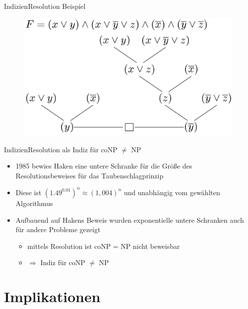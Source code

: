 \documentclass[ignorenonframetext,]{beamer}
\begin{document}
\begin{frame}{Indizien}{Resolution Beispiel}

\begin{figure}[htbp]
\centering
\includegraphics{img/res-beweis.png}
\end{figure}

\end{frame}

\begin{frame}{Indizien}{Resolution als Indiz für coNP $\neq$ NP}

\begin{itemize}
\itemsep1pt\parskip0pt
\item
  1985 bewies Haken eine untere Schranke für die Größe des
  Resolutionsbeweises für das Taubenschlagprinzip
\item
  Diese ist $(1.49^{0.01})^n \approx (1,004)^n$ und unabhängig vom
  gewählten Algorithmus
\item
  Aufbauend auf Hakens Beweis wurden exponentielle untere Schranken auch
  für andere Probleme gezeigt

  \begin{itemize}
  \itemsep1pt\parskip0pt
  \item
    mittels Resolution ist coNP = NP nicht beweisbar
  \item
    $\Rightarrow$ Indiz für coNP $\neq$ NP
  \end{itemize}
\end{itemize}

\end{frame}

\section{Implikationen}\label{implikationen}
\end{document}
